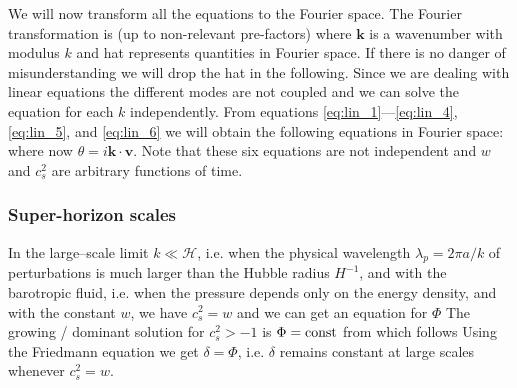 We will now transform all the equations to the Fourier space. The Fourier transformation is (up to non-relevant pre-factors)
where $\bm k$ is a wavenumber with modulus $k$ and hat represents quantities in Fourier space. If there is no danger of misunderstanding we will drop the hat in the following. Since we are dealing with linear equations the different modes are not coupled and we can solve the equation for each $k$ independently.
 From equations \eqref{eq:lin_1}---\eqref{eq:lin_4}, \eqref{eq:lin_5}, and \eqref{eq:lin_6} we will obtain the following equations in Fourier space:
where now $\theta=i\bm{k\cdot  v}$. Note that these six equations are not independent and $w$ and $c_s^2$ are arbitrary functions of time.
\subsubsection{Super-horizon scales}
In the large--scale limit $k\ll\mathcal{H}$, i.e. when the physical wavelength $\lambda_p=2\pi a/k$ of perturbations is much larger than the Hubble radius $H^{-1}$, and with the barotropic fluid, i.e. when the pressure depends only on the energy density, and with the constant $w$, we have $c_s^2=w$ and we can get an equation for $\Phi$
The growing / dominant solution for $c_s^2>-1$ is $\Phi=\rm{const}$ from which follows
Using the Friedmann equation we get $\delta=\Phi$, i.e. $\delta$ remains constant at large scales whenever $c_s^2=w$.
